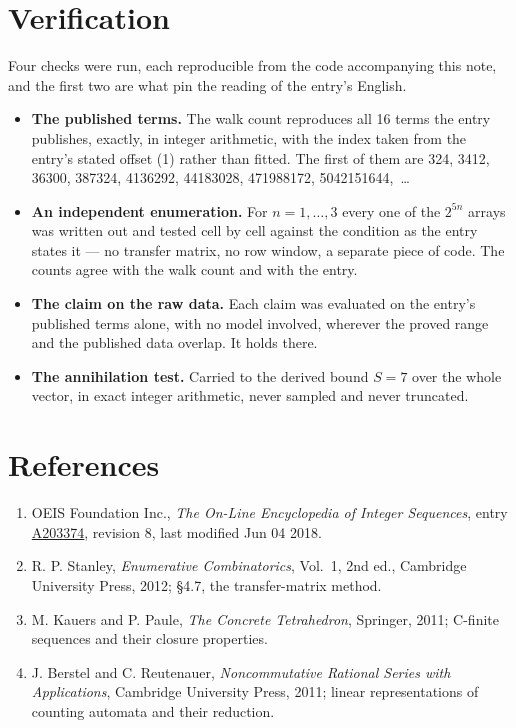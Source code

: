 \documentclass[11pt]{article}
\theoremstyle{definition}
\begin{document}
\section{Verification}

Four checks were run, each reproducible from the code accompanying this note, and the first two are what pin the reading of the entry's English.

\begin{itemize}

\item {\bfseries The published terms.} The walk count reproduces all 16 terms the entry publishes, exactly, in integer arithmetic, with the index taken from the entry's stated offset (1) rather than fitted. The first of them are 324, 3412, 36300, 387324, 4136292, 44183028, 471988172, 5042151644,~\dots

\item {\bfseries An independent enumeration.} For $n = 1,\dots,3$ every one of the $2^{5n}$ arrays was written out and tested cell by cell against the condition as the entry states it --- no transfer matrix, no row window, a separate piece of code. The counts agree with the walk count and with the entry.

\item {\bfseries The claim on the raw data.} Each claim was evaluated on the entry's published terms alone, with no model involved, wherever the proved range and the published data overlap. It holds there.

\item {\bfseries The annihilation test.} Carried to the derived bound $S = 7$ over the whole vector, in exact integer arithmetic, never sampled and never truncated.

\end{itemize}

\section{References}

\begin{enumerate}

\item OEIS Foundation Inc., \emph{The On-Line Encyclopedia of Integer Sequences}, entry \href{https://oeis.org/A203374}{A203374}, revision 8, last modified Jun 04 2018.

\item R. P. Stanley, \emph{Enumerative Combinatorics}, Vol.~1, 2nd ed., Cambridge University Press, 2012; \S4.7, the transfer-matrix method.

\item M. Kauers and P. Paule, \emph{The Concrete Tetrahedron}, Springer, 2011; C-finite sequences and their closure properties.

\item J. Berstel and C. Reutenauer, \emph{Noncommutative Rational Series with Applications}, Cambridge University Press, 2011; linear representations of counting automata and their reduction.

\end{enumerate}
\end{document}
